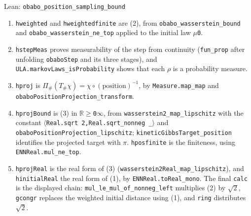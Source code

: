 \documentclass[11pt,a4paper]{article}
\begin{document}
\begin{leanbox}{Lean: \texttt{obabo\_\allowbreak{}position\_\allowbreak{}sampling\_\allowbreak{}bound}}
\begin{enumerate}
\item \texttt{hweighted} and \texttt{hweightedfinite} are (2), from \texttt{obabo\_\allowbreak{}wasserstein\_\allowbreak{}bound} and \texttt{obabo\_\allowbreak{}wasserstein\_\allowbreak{}ne\_\allowbreak{}top} applied to the initial law \texttt{\ensuremath{\mu}0}.

\item \texttt{hstep\allowbreak{}Meas} proves measurability of the step from continuity (\texttt{fun\_\allowbreak{}prop} after unfolding \texttt{obabo\allowbreak{}Step} and its three stages), and \texttt{ULA.\allowbreak{}markov\allowbreak{}Laws\_\allowbreak{}is\allowbreak{}Probability} shows that each \texttt{\ensuremath{\rho}} is a probability measure.

\item \texttt{hproj} is \(\Pi_\#(T_\#\chi)=\chi\circ(\text{position})^{-1}\), by \texttt{Measure.\allowbreak{}map\_\allowbreak{}map} and \texttt{obabo\allowbreak{}Position\allowbreak{}Projection\_\allowbreak{}transform}.

\item \texttt{hproj\allowbreak{}Bound} is (3) in \texttt{\ensuremath{\mathbb R}\ensuremath{\ge}0\ensuremath{\infty}}, from \texttt{wasserstein2\_\allowbreak{}map\_\allowbreak{}lipschitz} with the constant \texttt{\ensuremath{\langle}Real.\allowbreak{}sqrt 2,Real.\allowbreak{}sqrt\_\allowbreak{}nonneg \_\allowbreak{}\ensuremath{\rangle}} and \texttt{obabo\allowbreak{}Position\allowbreak{}Projection\_\allowbreak{}lipschitz}; \texttt{kinetic\allowbreak{}Gibbs\allowbreak{}Target\_\allowbreak{}position} identifies the projected target with \(\pi\). \texttt{hposfinite} is the finiteness, using \texttt{ENNReal.\allowbreak{}mul\_\allowbreak{}ne\_\allowbreak{}top}.

\item \texttt{hproj\allowbreak{}Real} is the real form of (3) (\texttt{wasserstein2\allowbreak{}Real\_\allowbreak{}map\_\allowbreak{}lipschitz}), and \texttt{hinitial\allowbreak{}Real} the real form of (1), by \texttt{ENNReal.\allowbreak{}to\allowbreak{}Real\_\allowbreak{}mono}. The final \texttt{calc} is the displayed chain: \texttt{mul\_\allowbreak{}le\_\allowbreak{}mul\_\allowbreak{}of\_\allowbreak{}nonneg\_\allowbreak{}left} multiplies (2) by \(\sqrt2\), \texttt{gcongr} replaces the weighted initial distance using (1), and \texttt{ring} distributes \(\sqrt2\).

\end{enumerate}
\end{leanbox}
\end{document}
